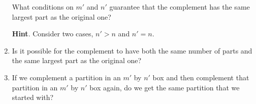 \documentclass{book}
\begin{document}
\begin{activity}
\begin{enumerate}[font=\bfseries,label=(\alph*),ref=\alph*]
What conditions on \(m'\) and \(n'\) guarantee that the complement has the same largest part as the original one?%
\par\smallskip%
\noindent\textbf{Hint}.\hypertarget{hint-195}{}\quad%
\hypertarget{p-1525}{}%
Consider two cases, \(n' \gt n\) and \(n' = n\).%
\par\smallskip%
\noindent\item\label{task-267} \hypertarget{p-1527}{}%
Is it possible for the complement to have both the same number of parts and the same largest part as the original one?%
\par\smallskip%
\noindent\item\label{task-268} \hypertarget{p-1529}{}%
If we complement a partition in an \(m'\) by \(n'\) box and then complement that partition in an \(m'\) by \(n'\) box again, do we get the same partition that we started with?%
\par\smallskip%
\noindent\end{enumerate}
\end{activity}

\clearpage
\end{document}
